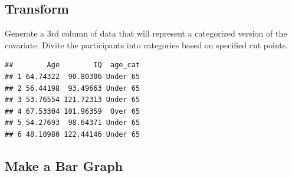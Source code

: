 \documentclass[
]{book}
\newenvironment{Shaded}{\begin{snugshade}}{\end{snugshade}}
\newcommand{\AttributeTok}[1]{\textcolor[rgb]{0.13,0.29,0.53}{#1}}
\newcommand{\CommentTok}[1]{\textcolor[rgb]{0.56,0.35,0.01}{\textit{#1}}}
\newcommand{\ConstantTok}[1]{\textcolor[rgb]{0.56,0.35,0.01}{#1}}
\newcommand{\DecValTok}[1]{\textcolor[rgb]{0.00,0.00,0.81}{#1}}
\newcommand{\FunctionTok}[1]{\textcolor[rgb]{0.13,0.29,0.53}{\textbf{#1}}}
\newcommand{\NormalTok}[1]{#1}
\newcommand{\OtherTok}[1]{\textcolor[rgb]{0.56,0.35,0.01}{#1}}
\newcommand{\SpecialCharTok}[1]{\textcolor[rgb]{0.81,0.36,0.00}{\textbf{#1}}}
\newcommand{\StringTok}[1]{\textcolor[rgb]{0.31,0.60,0.02}{#1}}
\begin{document}
\subsection*{Transform}\label{transform}

Generate a 3rd column of data that will represent a categorized version of the covariate. Divite the participants into categories based on specified cut points.

\begin{Shaded}
\end{Shaded}

\begin{verbatim}
##        Age        IQ  age_cat
## 1 64.74322  90.80306 Under 65
## 2 56.44198  93.49663 Under 65
## 3 53.76554 121.72313 Under 65
## 4 67.53304 101.96359  Over 65
## 5 54.27693  98.64371 Under 65
## 6 48.10980 122.44146 Under 65
\end{verbatim}

\subsection*{Make a Bar Graph}\label{make-a-bar-graph}
\end{document}
